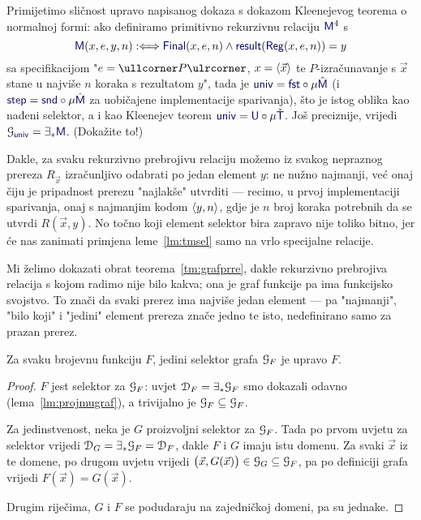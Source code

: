 Primijetimo sličnost upravo napisanog dokaza s dokazom Kleenejevog teorema o normalnoj formi: ako definiramo primitivno rekurzivnu relaciju $\f M^4$ s
\begin{equation}
    \f M(x,e,y,n):\Longleftrightarrow\f{Final}(x,e,n)\land\f{result}(\f{Reg}(x,e,n))=y
\end{equation}
sa specifikacijom "$e=\kprog P$, $x=\langle\vec x\rangle$ te $P$-izračunavanje s $\vec x$ stane u najviše $n$ koraka s rezultatom $y$", tada je $\f{univ}=\f{fst}\circ\mu\hat{\f M}$ (i $\f{step}=\f{snd}\circ\mu\hat{\f M}$ za uobičajene implementacije sparivanja), što je istog oblika kao nađeni selektor, a i kao Kleenejev teorem $\f{univ}=\f U\circ\mu\check{\f T}$. Još preciznije, vrijedi $\graf{\f{univ}}=\exists_*\f M$. (Dokažite to!)


Dakle, za svaku rekurzivno prebrojivu relaciju možemo iz svakog nepraznog prereza $R_{\vec x}$ izračunljivo odabrati po jedan element $y$: ne nužno najmanji, već onaj čiju je pripadnost prerezu "najlakše" utvrditi --- recimo, u prvoj implementaciji sparivanja, onaj s najmanjim kodom $\langle y,n\rangle$, gdje je $n$ broj koraka potrebnih da se utvrdi $R(\vec x,y)$.
%
No točno koji element selektor bira zapravo nije toliko bitno, jer će nas zanimati primjena leme~\ref{lm:tmsel} samo na vrlo specijalne relacije.

Mi želimo dokazati obrat teorema~\ref{tm:grafprre}, dakle rekurzivno prebrojiva relacija s kojom radimo nije bilo kakva; ona je graf funkcije pa ima funkcijsko svojstvo. To znači da svaki prerez ima najviše jedan element --- pa "najmanji", "bilo koji" i "jedini" element prereza znače jedno te isto, nedefinirano samo za prazan prerez.

\begin{lema}[{name=[jedinstvenost selektora grafa funkcije]}]\label{lm:selgraf}
Za svaku brojevnu funkciju $F$, jedini selektor grafa $\mathcal G_{F}$ je upravo $F$.
\end{lema}
\begin{proof}
$F$ jest selektor za $\mathcal G_{F}$: uvjet $\mathcal D_{F}=\exists_*\mathcal G_{F}$ smo dokazali odavno (lema~\ref{lm:projmugraf}), a trivijalno je $\mathcal G_{F}\subseteq\mathcal G_{F}$.

Za jedinstvenost, neka je $G$ proizvoljni selektor za $\mathcal G_{F}$. Tada po prvom uvjetu za selektor vrijedi $\mathcal D_{G}=\exists_*\mathcal G_{F}=\mathcal D_{F}$, dakle $F$ i $G$ imaju istu domenu. Za svaki $\vec x$ iz te domene, po drugom uvjetu vrijedi $\bigl(\vec x,G(\vec x)\bigr)\in\mathcal G_{G}\subseteq\mathcal G_{F}$, pa po definiciji grafa vrijedi $F(\vec x)=G(\vec x)$.

Drugim riječima, $G$ i $F$ se podudaraju na zajedničkoj domeni, pa su jednake.
\end{proof}

